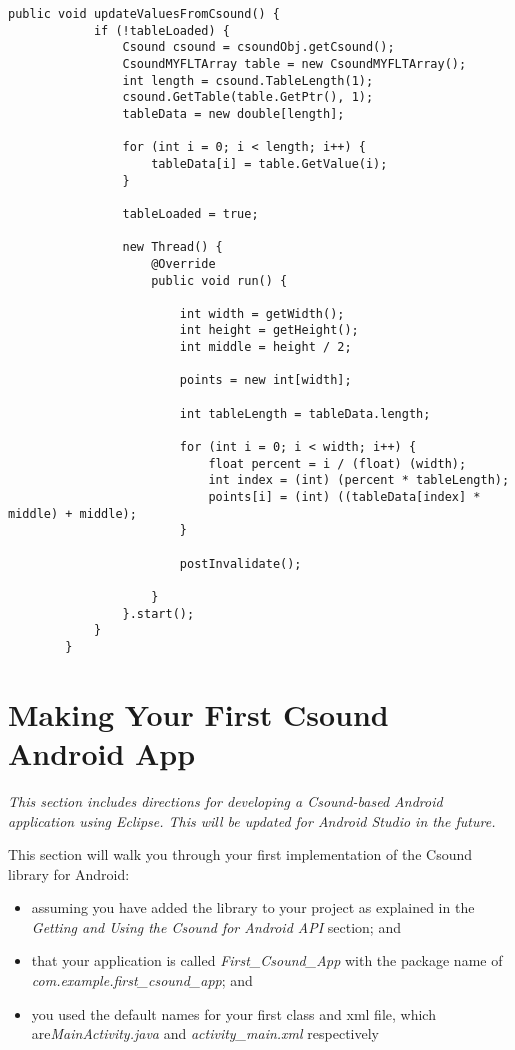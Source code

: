 \documentclass[11pt]{article}
\begin{document}
\begin{lstlisting}[caption=Waveview code demonstrating reading f-tables from Csound]
		public void updateValuesFromCsound() {
			if (!tableLoaded) {
				Csound csound = csoundObj.getCsound();
				CsoundMYFLTArray table = new CsoundMYFLTArray();
				int length = csound.TableLength(1);
				csound.GetTable(table.GetPtr(), 1);
				tableData = new double[length];

				for (int i = 0; i < length; i++) {
					tableData[i] = table.GetValue(i);
				}

				tableLoaded = true;

				new Thread() {
					@Override
					public void run() {

						int width = getWidth();
						int height = getHeight();
						int middle = height / 2;

						points = new int[width];

						int tableLength = tableData.length;

						for (int i = 0; i < width; i++) {
							float percent = i / (float) (width);
							int index = (int) (percent * tableLength);
							points[i] = (int) ((tableData[index] * middle) + middle);
						}

						postInvalidate();

					}
				}.start();
			}
		}
\end{lstlisting}



\section{Making Your First Csound Android App }

\emph{This section includes directions for developing a Csound-based Android application using Eclipse. This will be updated for Android Studio in the future.} 

This section will walk you through your first implementation of the Csound library for Android: 
\begin{itemize}
\item assuming you have added the library to your project as explained in the \textit{Getting and Using the Csound for Android API} section; and
\item  that your application is called \textit{First_Csound_App} with the package name of \textit{com.example.first_csound_app}; and
\item you used the default names for your first class and xml file, which are\textit{MainActivity.java}  and  \textit{activity_main.xml}  respectively
\end{itemize}
\end{document}

